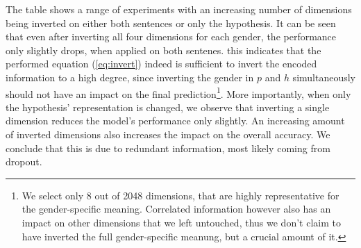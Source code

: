 The table shows a range of experiments with an increasing number of dimensions being inverted on either both sentences or only the hypothesis. It can be seen that even after inverting all four dimensions for each gender, the performance only slightly drops, when applied on both sentenes. this indicates that the performed equation (\ref{eq:invert}) indeed is sufficient to invert the encoded information to a high degree, since inverting the gender in $p$ and $h$ simultaneously should not have an impact on the final prediction\footnote{We select only 8 out of 2048 dimensions, that are highly representative for the gender-specific meaning. Correlated information however also has an impact on other dimensions that we left untouched, thus we don't claim to have inverted the full gender-specific meanung, but a crucial amount of it.}. More importantly, when only the hypothesis' representation is changed, we observe that inverting a single dimension reduces the model's performance only slightly. An increasing amount of inverted dimensions also increases the impact on the overall accuracy. We conclude that  this is due to redundant information, most likely coming from dropout. 
